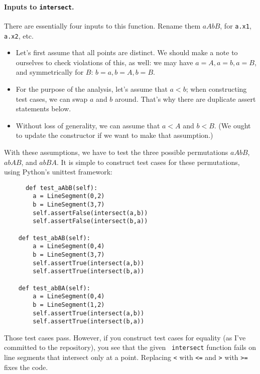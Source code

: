 \documentclass[11pt]{article}
\begin{document}
\paragraph{Inputs to {\tt intersect}.} There are essentially
four inputs to this function. Rename them $aAbB$, for {\tt a.x1},
{\tt a.x2}, etc.
\begin{itemize}
\item Let's first assume that all points are distinct. We should
  make a note to ourselves to check violations of this, as well:
  we may have $a = A, a = b, a = B$, and symmetrically for $B$:
  $b = a, b = A, b = B$.
  \item For the purpose of the analysis, let's assume that $a < b$;
    when constructing test cases, we can swap $a$ and $b$ around.
    That's why there are duplicate assert statements below.
  \item Without loss of generality, we can assume that
$a < A$ and $b < B$. (We ought to update the constructor if we
    want to make that assumption.) 
\end{itemize}
With these assumptions, we have to test the three possible permutations
$aAbB$, $abAB$, and $abBA$. It is simple to construct test cases
for these permutations, using Python's unittest framework:
\begin{lstlisting}
      def test_aAbB(self):
        a = LineSegment(0,2)
        b = LineSegment(3,7)
        self.assertFalse(intersect(a,b))
        self.assertFalse(intersect(b,a))

    def test_abAB(self):
        a = LineSegment(0,4)
        b = LineSegment(3,7)
        self.assertTrue(intersect(a,b))
        self.assertTrue(intersect(b,a))

    def test_abBA(self):
        a = LineSegment(0,4)
        b = LineSegment(1,2)
        self.assertTrue(intersect(a,b))
        self.assertTrue(intersect(b,a))
\end{lstlisting}
Those test cases pass. However, if you construct test cases for
equality (as I've committed to the repository), you see that the given {\tt
  intersect} function fails on line segments that intersect only at a
point. Replacing \verb+<+ with \verb+<=+ and \verb+>+ with \verb+>=+
fixes the code.
\end{document}
